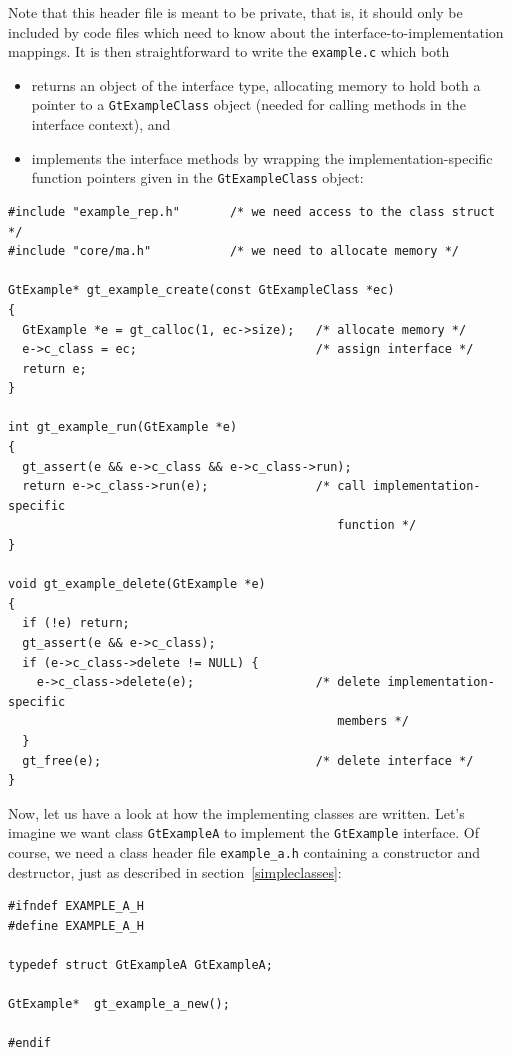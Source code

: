 \documentclass[11pt,final]{article}
\newcommand{\keyword}[1]{\lstinline{#1}}
\begin{document}
Note that this header file is meant to be private, that is, it should only be
included by code files which need to know about the interface-to-implementation
mappings. It is then straightforward to write the \keyword{example.c} which both
\begin{itemize}
\item
returns an object of the interface type, allocating memory to hold both a
pointer to a \keyword{GtExampleClass} object (needed for calling methods in the
interface context), and
\item
implements the interface methods by wrapping the implementation-specific
function pointers given in the \keyword{GtExampleClass} object:
\end{itemize}

\begin{lstlisting}
#include "example_rep.h"       /* we need access to the class struct */
#include "core/ma.h"           /* we need to allocate memory */

GtExample* gt_example_create(const GtExampleClass *ec)
{
  GtExample *e = gt_calloc(1, ec->size);   /* allocate memory */
  e->c_class = ec;                         /* assign interface */
  return e;
}

int gt_example_run(GtExample *e)
{
  gt_assert(e && e->c_class && e->c_class->run);
  return e->c_class->run(e);               /* call implementation-specific
                                              function */
}

void gt_example_delete(GtExample *e)
{
  if (!e) return;
  gt_assert(e && e->c_class);
  if (e->c_class->delete != NULL) {
    e->c_class->delete(e);                 /* delete implementation-specific
                                              members */
  }
  gt_free(e);                              /* delete interface */
}
\end{lstlisting}

Now, let us have a look at how the implementing classes are written. Let's
imagine we want class \keyword{GtExampleA} to implement the \keyword{GtExample}
interface. Of course, we need a class header file \keyword{example_a.h}
containing a constructor and destructor, just as described in
section~\ref{simpleclasses}:

\begin{lstlisting}
#ifndef EXAMPLE_A_H
#define EXAMPLE_A_H

typedef struct GtExampleA GtExampleA;

GtExample*  gt_example_a_new();

#endif
\end{lstlisting}
\end{document}
